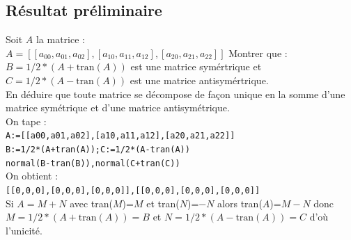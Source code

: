 \documentclass[a4paper,11pt]{book}
\begin{document}
\subsection{R\'esultat pr\'eliminaire}
Soit $A$ la matrice :\\
$A=[[a_{00},a_{01},a_{02}],[a_{10},a_{11},a_{12}],[a_{20},a_{21},a_{22}]]$
Montrer que :\\
$B=1/2*(A+\mbox{tran}(A))$ est une matrice sym\'ertrique et\\
$C=1/2*(A-\mbox{tran}(A))$ est une matrice antisym\'ertrique.\\
En d\'eduire que toute matrice se d\'ecompose de fa\c{c}on unique en la somme 
d'une matrice sym\'etrique et d'une matrice antisym\'etrique.\\
On tape :\\
{\tt A:=[[a00,a01,a02],[a10,a11,a12],[a20,a21,a22]]}\\
{\tt B:=1/2*(A+tran(A));C:=1/2*(A-tran(A))}\\
{\tt normal(B-tran(B)),normal(C+tran(C))}\\
On obtient :\\
{\tt [[0,0,0],[0,0,0],[0,0,0]],[[0,0,0],[0,0,0],[0,0,0]]}\\
Si $A=M+N$ avec tran($M$)=$M$ et tran($N$)=$-N$ alors tran($A$)=$M-N$ donc \\
$M=1/2*(A+\mbox{tran}(A))=B$ et $N=1/2*(A-\mbox{tran}(A))=C$ d'o\`u l'unicit\'e.
\end{document}
